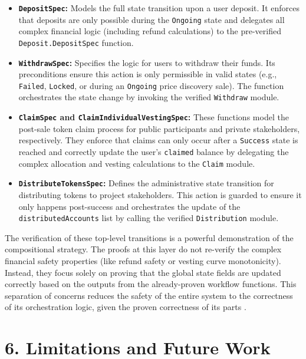 \documentclass[
  english,
  onecolumn]{article}
\providecommand{\tightlist}{%
  \setlength{\itemsep}{0pt}\setlength{\parskip}{0pt}}
\begin{document}
\begin{itemize}
\tightlist
\item
  \textbf{\texttt{DepositSpec}:} Models the full state transition upon a
  user deposit. It enforces that deposits are only possible during the
  \texttt{Ongoing} state and delegates all complex financial logic
  (including refund calculations) to the pre-verified
  \texttt{Deposit.DepositSpec} function.
\item
  \textbf{\texttt{WithdrawSpec}:} Specifies the logic for users to
  withdraw their funds. Its preconditions ensure this action is only
  permissible in valid states (e.g., \texttt{Failed}, \texttt{Locked},
  or during an \texttt{Ongoing} price discovery sale). The function
  orchestrates the state change by invoking the verified
  \texttt{Withdraw} module.
\item
  \textbf{\texttt{ClaimSpec} and \texttt{ClaimIndividualVestingSpec}:}
  These functions model the post-sale token claim process for public
  participants and private stakeholders, respectively. They enforce that
  claims can only occur after a \texttt{Success} state is reached and
  correctly update the user's \texttt{claimed} balance by delegating the
  complex allocation and vesting calculations to the \texttt{Claim}
  module.
\item
  \textbf{\texttt{DistributeTokensSpec}:} Defines the administrative
  state transition for distributing tokens to project stakeholders. This
  action is guarded to ensure it only happens post-success and
  orchestrates the update of the \texttt{distributedAccounts} list by
  calling the verified \texttt{Distribution} module.
\end{itemize}

The verification of these top-level transitions is a powerful
demonstration of the compositional strategy. The proofs at this layer do
not re-verify the complex financial safety properties (like refund
safety or vesting curve monotonicity). Instead, they focus solely on
proving that the global state fields are updated correctly based on the
outputs from the already-proven workflow functions. This separation of
concerns reduces the safety of the entire system to the correctness of
its orchestration logic, given the proven correctness of its parts
\citep{cohen2017certified}.

\section{6. Limitations and Future
Work}\label{limitations-and-future-work}
\end{document}
